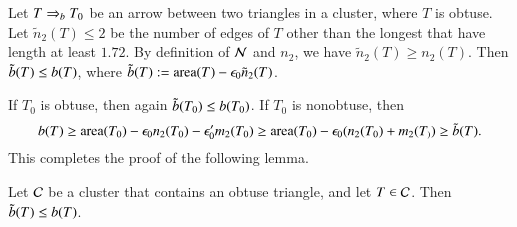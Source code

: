 Let $T\Rightarrow_{b} T_0$ be an arrow between two triangles in a cluster, where $T$ is obtuse.
Let $\tilde n_2(T)\le 2$ be the number of edges of $T$ other than the longest that
have length at least $1.72$.  By definition of $\mathcal N$ and $n_2$, we have $\tilde n_2(T)\ge n_2(T)$.
Then $\tilde b(T) \le b(T)$, where $\tilde b(T) := {\operatorname{area}}(T)-\epsilon_0\tilde n_2(T)$.

If $T_0$ is obtuse, then again $\tilde b(T_0)\le b(T_0)$.
If $T_0$ is nonobtuse, then
\[
b(T) \ge {\operatorname{area}}(T_0) - \epsilon_0 n_2(T_0) - \epsilon_0' m_2(T_0) \ge {\operatorname{area}}(T_0) - \epsilon_0 (n_2(T_0)+m_2(T_)) \ge \tilde b(T).
\]
This completes the proof of the following lemma.

\begin{lemma} Let $\mathcal C$ be  a cluster that contains an obtuse triangle, and
let $T\in \mathcal C$.  Then  $\tilde b(T)\le b(T)$.
\end{lemma}






